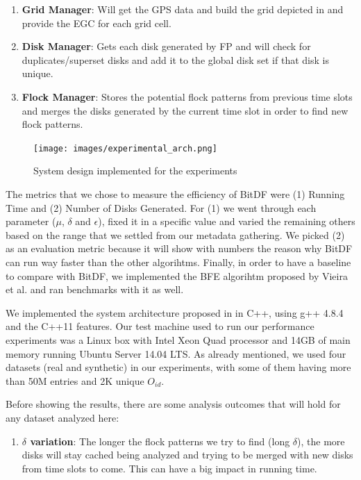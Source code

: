 {\begin{enumerate}
    \item \textbf{Grid Manager}: Will get the GPS data and build the grid depicted in  and provide the
        EGC for each grid cell.
    \item \textbf{Disk Manager}: Gets each disk generated by FP and will check for duplicates/superset disks and add it
        to the global disk set if that disk is unique.
    \item \textbf{Flock Manager}: Stores the potential flock patterns from previous time slots and merges the disks
        generated by the current time slot in order to find new flock patterns.
\end{enumerate}

\begin{figure}[h!]
    \centering
    \texttt{[image: images/experimental\_arch.png]}
    \caption{System design implemented for the experiments}
    \label{fig:experimental_arch}
\end{figure}

The metrics that we chose to measure the efficiency of BitDF were (1) Running Time and (2) Number of Disks Generated.
For (1) we went through each parameter ($\mu$, $\delta$ and $\epsilon$), fixed it in a specific value and varied the
remaining others based on the range that we settled from our metadata gathering. We picked (2) as an evaluation metric
because it will show with numbers the reason why BitDF can run way faster than the other algorihtms. Finally, in order
to have a baseline to compare with BitDF, we implemented the BFE algorihtm proposed by Vieira et al. \citep{vieira} and
ran benchmarks with it as well.

We implemented the system architecture proposed in  in C++, using g++ 4.8.4 and the C++11
\citep{cpp11spec} features. Our test machine used to run our performance experiments was a Linux box with Intel Xeon
Quad processor and 14GB of main memory running Ubuntu Server 14.04 LTS. As already mentioned, we used four datasets
(real and synthetic) in our experiments, with some of them having more than 50M entries and 2K unique $O_{id}$.

Before showing the results, there are some analysis outcomes that will hold for any dataset analyzed here:

\begin{enumerate}
    \item \textbf{$\delta$ variation}: The longer the flock patterns we try to find (long $\delta$), the more disks will
        stay cached being analyzed and trying to be merged with new disks from time slots to come. This can have a big
        impact in running time.\label{sssec:lvariation}


\end{enumerate}}
